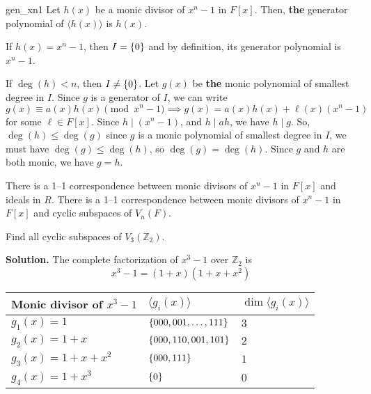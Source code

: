 \begin{Theorem}{}{gen_xn1}
    Let $ h(x) $ be a monic divisor of $ x^n-1 $ in $ F[x] $.
    Then, \textbf{the} generator polynomial of $ \langle h(x)\rangle $
    is $ h(x) $.
\end{Theorem}

\begin{Proof}{}{}
    If $ h(x)=x^n-1 $, then $ I=\{0\} $ and by definition, its
    generator polynomial is $ x^n-1 $.

    If $ \deg(h)<n $, then $ I\neq \{0\} $. Let $ g(x) $
    be \textbf{the} monic polynomial of smallest degree in $ I $.
    Since $ g $ is a generator of $ I $, we can write
    \[ g(x)\equiv a(x)h(x)\pmod{x^n-1}\implies g(x)=a(x)h(x)+\ell(x)(x^n-1) \]
    for some $ \ell\in F[x] $. Since $ h\mid (x^n-1) $, and $ h\mid ah $,
    we have $ h\mid g $. So, $ \deg(h)\leqslant \deg(g) $ since
    $ g $ is a monic polynomial of smallest degree in $ I $,
    we must have $ \deg(g)\leqslant \deg(h) $, so $ \deg(g)=\deg(h) $.
    Since $ g $ and $ h $ are both monic, we have
    $ g=h $.
\end{Proof}

\begin{Corollary}{}{}
    There is a 1--1 correspondence between monic
    divisors of $ x^n-1 $ in $ F[x] $ and ideals in $ R $.
    There is a 1--1 correspondence between monic
    divisors of $ x^n-1 $ in $ F[x] $ and cyclic
    subspaces of $ V_n(F) $.
\end{Corollary}

\begin{Example}{}{}
    Find all cyclic subspaces of $ V_3(\mathbb{Z}_2) $.

    \textbf{Solution.} The complete factorization
    of $ x^3-1 $ over $ \mathbb{Z}_2 $ is
    \[ x^3-1=(1+x)(1+x+x^2) \]

    \begin{table}[H]
        \centering
        \begin{tabularx}{0.8\linewidth}{@{}YYY@{}}
            Monic divisor of $ x^3-1 $ & $ \langle g_i(x) \rangle $    & $ \dim \langle g_i(x) \rangle $ \\
            \midrule
            \midrule
            $ g_1(x)=1 $               & $ \{000,001,\ldots ,111\} $ & $ 3 $                           \\
            \midrule
            $ g_2(x)=1+x $             & $ \{000,110,001,101\} $     & $ 2 $                           \\
            \midrule
            $ g_3(x)=1+x+x^2 $         & $ \{000,111\} $             & $ 1 $                           \\
            \midrule
            $ g_4(x)=1+x^3 $           & $ \{0\} $                   & $ 0 $                           \\
        \end{tabularx}
    \end{table}
\end{Example}
